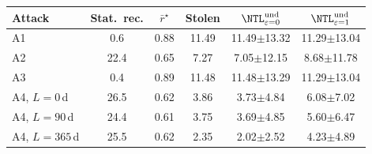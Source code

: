\begin{tabular}{lccccc}
\toprule
Attack & Stat.\ rec. & $\bar r^\star$ & Stolen & $\NTL^{\mathrm{und}}_{\varepsilon=0}$ & $\NTL^{\mathrm{und}}_{\varepsilon=1}$ \\
\midrule
A1 & 0.6 & 0.88 & 11.49 & 11.49$\pm$13.32 & 11.29$\pm$13.04 \\
A2 & 22.4 & 0.65 & 7.27 & 7.05$\pm$12.15 & 8.68$\pm$11.78 \\
A3 & 0.4 & 0.89 & 11.48 & 11.48$\pm$13.29 & 11.29$\pm$13.04 \\
A4, $L{=}0$\,d & 26.5 & 0.62 & 3.86 & 3.73$\pm$4.84 & 6.08$\pm$7.02 \\
A4, $L{=}90$\,d & 24.4 & 0.61 & 3.75 & 3.69$\pm$4.85 & 5.60$\pm$6.47 \\
A4, $L{=}365$\,d & 25.5 & 0.62 & 2.35 & 2.02$\pm$2.52 & 4.23$\pm$4.89 \\
\bottomrule
\end{tabular}
